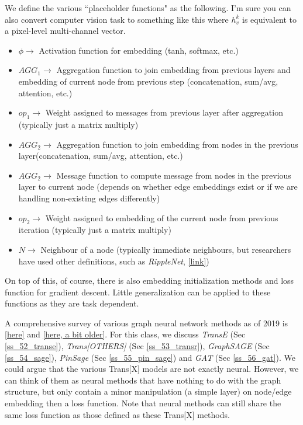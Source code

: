We define the various ``placeholder functions" as the following. I'm sure you can also convert computer vision task to something like this where $h_v^k$ is equivalent to a pixel-level multi-channel vector. 

\begin{itemize}
    \item $\phi \rightarrow$ Activation function for embedding (tanh, softmax, etc.)
    
    \item $AGG_1 \rightarrow$ Aggregation function to join embedding from previous layers and embedding of current node from previous step (concatenation, sum/avg, attention, etc.)
    
    \item $op_1 \rightarrow$ Weight assigned to messages from previous layer after aggregation (typically just a matrix multiply)
    
    \item $AGG_2 \rightarrow$ Aggregation function to join embedding from nodes in the previous layer(concatenation, sum/avg, attention, etc.)
    
    \item $AGG_2 \rightarrow$ Message function to compute message from nodes in the previous layer to current node (depends on whether edge embeddings exist or if we are handling non-existing edges differently)
    
    \item $op_2 \rightarrow$ Weight assigned to embedding of the current node from previous iteration (typically just a matrix multiply)
    
    \item $N \rightarrow$ Neighbour of a node (typically immediate neighbours, but researchers have used other definitions, such as \textit{RippleNet}, \href{https://arxiv.org/pdf/1803.03467.pdf}{[link]})
\end{itemize}

On top of this, of course, there is also embedding initialization methods and loss function for gradient descent. Little generalization can be applied to these functions as they are task dependent.

A comprehensive survey of various graph neural network methods as of 2019 is \href{https://arxiv.org/pdf/1901.00596.pdf}{[here]} and \href{https://arxiv.org/pdf/1812.08434.pdf}{[here, a bit older]}. For this class, we discuss \textit{TransE} (Sec \ref{ss_52_transe}), \textit{Trans[OTHERS]} (Sec \ref{ss_53_transr}), \textit{GraphSAGE} (Sec \ref{ss_54_sage}), \textit{PinSage} (Sec \ref{ss_55_pin_sage}) and \textit{GAT} (Sec \ref{ss_56_gat}). We could argue that the various Trans[X] models are not exactly neural. However, we can think of them as neural methods that have nothing to do with the graph structure, but only contain a minor manipulation (a simple layer) on node/edge embedding then a loss function. Note that neural methods can still share the same loss function as those defined as these Trans[X] methods.



